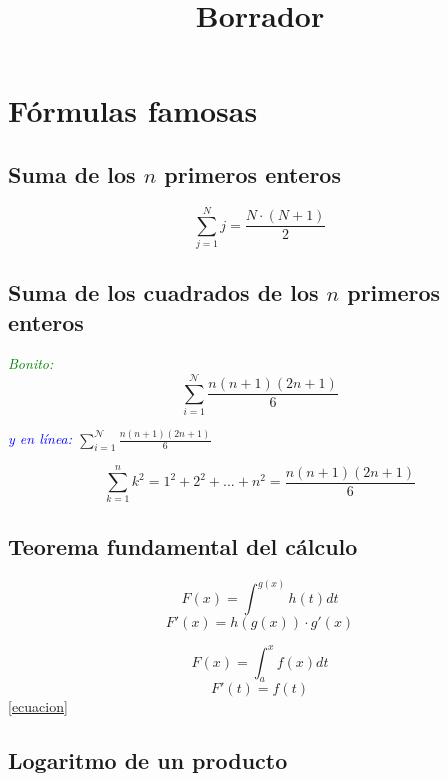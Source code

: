 \documentclass{article}
\author{}
\date{}
\title{Borrador}
\begin{document}
\maketitle


\begin{abstract}

\end{abstract}

\section{F\'ormulas famosas}

\subsection{Suma de los $n$ primeros enteros}

\[\sum_{j=1}^{N}j=\frac{N·(N+1)}{2}\]


\subsection{Suma de los cuadrados de los $n$ primeros enteros}



\textit{\textcolor{green}{{\large B}{\small onito:}}} \[ \sum_{i=1}^\mathcal{N} \frac{n(n+1)(2n+1)}{6} \]

\textit{\textcolor{blue}{y en l\'inea: }}$\sum_{i=1}^\mathcal{N} \frac{n(n+1)(2n+1)}{6} $

\[ \sum_{k=1}^n k^2 = 1^2 + 2^2 + ... + n^2 = \frac{n(n+1)(2n+1)}{6}\]

\subsection{Teorema fundamental del c\'alculo}


\begin{equation} F(x)=\int^{g(x)} h(t) dt \end{equation}
\begin{equation} F'(x)=h(g(x))·g'(x) \label{ecuacion}\end{equation}


\[F(x) = \int_a^xf(x)dt\]
\[F'(t)=f(t)\]
\ref{ecuacion}

\subsection{Logaritmo de un producto}
\end{document}

